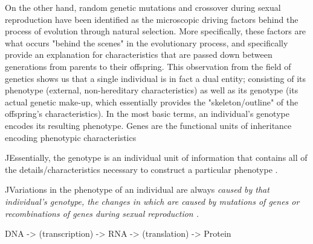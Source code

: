 On the other hand, random genetic mutations and crossover during sexual reproduction have been identified as the microscopic driving factors behind the process of evolution through natural selection. 
More specifically, these factors are what occurs "behind the scenes" in the evolutionary process, and specifically provide an explanation for characteristics that are passed down between generations from parents to their offspring. 
This observation from the field of genetics shows us that a single individual is in fact a dual entity; consisting of its phenotype (external, non-hereditary characteristics) as well as its genotype (its actual genetic make-up, which essentially provides the "skeleton/outline" of the offspring's characteristics).
In the most basic terms, an individual's genotype encodes its resulting phenotype.
Genes are the functional units of inheritance encoding phenotypic characteristics


^^
Essentially, the genotype is an individual unit of information that contains all of the details/characteristics necessary to construct a particular phenotype \cite{EibenSmith2003}.


^^
Variations in the phenotype of an individual are always \it{caused} by that individual's genotype, the changes in which are caused by mutations of genes or recombinations of genes during sexual reproduction \cite{EibenSmith2003}.

DNA -> (transcription) -> RNA -> (translation) -> Protein



